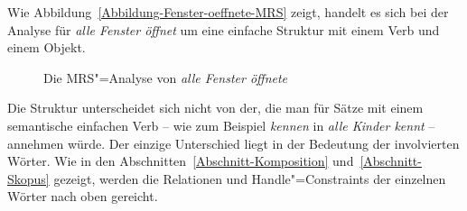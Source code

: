 Wie Abbildung~\vref{Abbildung-Fenster-oeffnete-MRS} zeigt, handelt es sich bei der
Analyse für \emph{alle Fenster öffnet} um eine einfache Struktur mit einem Verb und einem Objekt.
\begin{figure}
\caption{\label{Abbildung-Fenster-oeffnete-MRS}Die MRS"=Analyse von \emph{alle Fenster öffnete}}
\end{figure}
Die Struktur unterscheidet sich nicht von der, die man für Sätze mit einem semantische einfachen
Verb -- wie zum Beispiel \emph{kennen} in \emph{alle Kinder kennt} -- annehmen würde. Der einzige
Unterschied liegt in der Bedeutung der involvierten Wörter.  Wie in den
Abschnitten~\ref{Abschnitt-Komposition} und~\ref{Abschnitt-Skopus} gezeigt, werden die Relationen und
Handle"=Constraints der einzelnen Wörter nach oben gereicht. 

